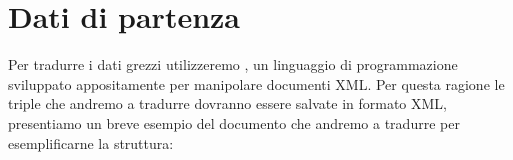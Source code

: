\section{Dati di partenza}
	Per tradurre i dati grezzi utilizzeremo \cduce, un linguaggio di programmazione sviluppato appositamente per manipolare documenti XML.  Per questa ragione le triple che andremo a tradurre dovranno essere salvate in formato XML, presentiamo un breve esempio del documento che andremo a tradurre per esemplificarne la struttura:
	\